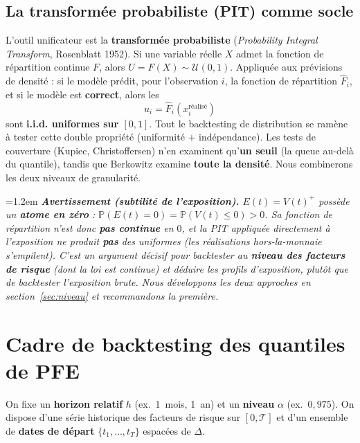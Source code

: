 \documentclass[11pt,a4paper]{article}
\newcommand{\Prob}{\mathbb{P}}
\newenvironment{remarque}
  {\par\smallskip\noindent\begin{minipage}{\linewidth}\leftskip=1.2em
   \footnotesize\itshape}
  {\end{minipage}\par\smallskip}
\theoremstyle{remark}
\begin{document}
\subsection{La transformée probabiliste (PIT) comme socle}
\label{sec:pit}

L'outil unificateur est la \textbf{transformée probabiliste} (\emph{Probability Integral Transform}, Rosenblatt 1952). Si une variable réelle $X$ admet la fonction de répartition continue $F$, alors $U = F(X) \sim \mathcal{U}(0,1)$. Appliquée aux prévisions de densité : si le modèle prédit, pour l'observation $i$, la fonction de répartition $\hat F_i$, et si le modèle est \textbf{correct}, alors les
\begin{equation}
u_i = \hat F_i(x_i^{\text{réalisé}})
\end{equation}
sont \textbf{i.i.d. uniformes sur $[0,1]$}. Tout le backtesting de distribution se ramène à tester cette double propriété (uniformité $+$ indépendance). Les tests de couverture (Kupiec, Christoffersen) n'en examinent qu'\textbf{un seuil} (la queue au-delà du quantile), tandis que Berkowitz examine \textbf{toute la densité}. Nous combinerons les deux niveaux de granularité.

\begin{remarque}
\textbf{Avertissement (subtilité de l'exposition).} $E(t) = V(t)^{+}$ possède un \textbf{atome en zéro} : $\Prob(E(t)=0) = \Prob(V(t)\le 0) > 0$. Sa fonction de répartition n'est donc \textbf{pas continue} en $0$, et la PIT appliquée \emph{directement à l'exposition} ne produit \textbf{pas} des uniformes (les réalisations hors-la-monnaie s'empilent). C'est un argument décisif pour backtester au \textbf{niveau des facteurs de risque} (dont la loi est continue) et déduire les profils d'exposition, plutôt que de backtester l'exposition brute. Nous développons les deux approches en section~\ref{sec:niveau} et recommandons la première.
\end{remarque}

\section{Cadre de backtesting des quantiles de PFE}
\label{sec:cadre}

On fixe un \textbf{horizon relatif} $h$ (ex.\ 1~mois, 1~an) et un \textbf{niveau} $\alpha$ (ex.\ $0{,}975$). On dispose d'une série historique des facteurs de risque sur $[0, \mathcal{T}]$ et d'un ensemble de \textbf{dates de départ} $\{t_1, \dots, t_T\}$ espacées de $\Delta$.
\end{document}
